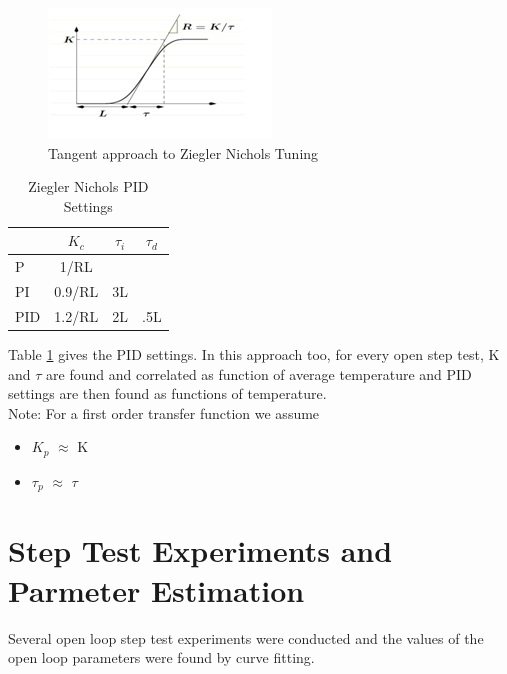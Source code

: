 \begin{figure}[h]
	\centering
\includegraphics[width = 0.7\linewidth]{Vikas_self/report_tex/ziegler.jpg}
	\caption{Tangent approach to Ziegler Nichols Tuning}
	\label{ziegler}
\end{figure}


\begin{table}[h]
	\centering
	\begin{tabular}{|l||c|c|c|}\hline
		  & $K_c$ & $\tau_i$ & $\tau_d$ \\ \hline \hline
		P & 1/RL & & \\ \hline
		PI & 0.9/RL & 3L& \\ \hline
		PID & 1.2/RL & 2L & .5L\\ \hline
	\end{tabular}
	\caption{Ziegler Nichols PID Settings}
	\label{ziegler}
\end{table}


Table \ref{ziegler} gives the PID settings. In this approach too, for every open step test, K and $\tau$ are found and 
correlated as function of average temperature and PID settings are then found as functions of temperature.
\\Note: For a first order transfer function we assume
\begin{itemize}
	\item $K_p$ $\approx$ K 
	\item $\tau_p$ $\approx$ $\tau$
\end{itemize}

\section{Step Test Experiments and Parmeter Estimation}
Several open loop step test experiments were conducted and the values of the open loop parameters were found by curve 
fitting. 
